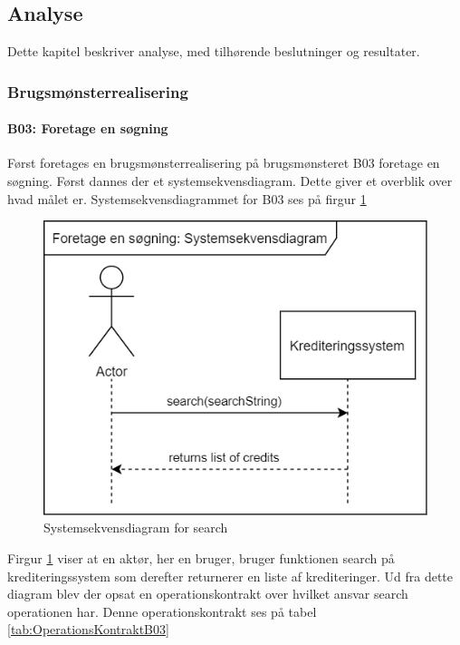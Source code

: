 \hfuzz=100pt
\vfuzz=100pt
\subsection{Analyse}

Dette kapitel beskriver analyse, med tilhørende beslutninger og resultater.

\subsubsection{Brugsmønsterrealisering}

\paragraph{B03: Foretage en søgning} Først foretages en brugsmønsterrealisering på brugsmønsteret B03 foretage en søgning. Først dannes der et systemsekvensdiagram. Dette giver et overblik over hvad målet er. Systemsekvensdiagrammet for B03 ses på firgur \ref{fig:SystemsekvensdiagramSearch} 

\begin{figure}[H]
    \centering
\includegraphics[scale = 0.5]{images/B03SSD.png}
    \caption{Systemsekvensdiagram for search}
    \label{fig:SystemsekvensdiagramSearch}
\end{figure}

Firgur \ref{fig:SystemsekvensdiagramSearch} viser at en aktør, her en bruger, bruger funktionen search på krediteringssystem som derefter returnerer en liste af krediteringer. Ud fra dette diagram blev der opsat en operationskontrakt over hvilket ansvar search operationen har. Denne operationskontrakt ses på tabel \ref{tab:OperationsKontraktB03}

